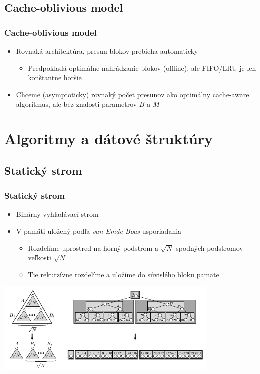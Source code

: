 \documentclass{beamer}
\begin{document}
\subsection{Cache-oblivious model}
\begin{frame}
	\frametitle{Cache-oblivious model}
	\begin{itemize}
		\item Rovnaká architektúra, presun blokov prebieha automaticky
		\begin{itemize}
			\item Predpokladá optimálne nahrádzanie blokov (offline), ale FIFO/LRU je len konštantne horšie
		\end{itemize}
		\item Chceme (asymptoticky) rovnaký počet presunov ako optimálny cache-aware algoritmus, ale bez znalosti parametrov $B$ a $M$
	\end{itemize}
\end{frame}

\section{Algoritmy a dátové štruktúry}
\subsection{Statický strom}
\begin{frame}
    \frametitle{Statický strom}
    \begin{itemize}
        \item Binárny vyhľadávací strom
        \item V pamäti uložený podľa {\em van Emde Boas} usporiadania
        \begin{itemize}
            \item Rozdelíme uprostred na horný podstrom a $\sqrt{N}$ spodných podstromov veľkosti $\sqrt{N}$
            \item Tie rekurzívne rozdelíme a uložíme do súvislého bloku pamäte
        \end{itemize}
    \end{itemize}
    \begin{center}
        \includegraphics[width=0.8\textwidth,]{../figures/downloaded_dont_use/cobplus-tree-crop.png}
    \end{center}
\end{frame}
\end{document}
